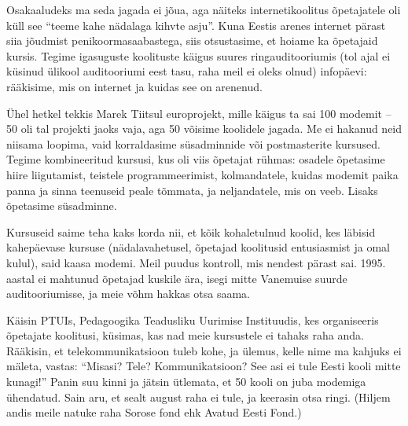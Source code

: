 
Osakaaludeks ma seda jagada ei jõua, aga näiteks internetikoolitus 
õpetajatele oli küll see \enquote{teeme kahe nädalaga kihvte asju}. Kuna Eestis 
arenes internet pärast siia jõudmist
penikoormasaabastega, siis otsustasime, et hoiame ka õpetajaid 
kursis. Tegime igasuguste koolituste käigus suures ringauditooriumis (tol 
ajal ei küsinud ülikool auditooriumi eest tasu, raha meil ei oleks 
olnud) infopäevi: rääkisime, mis on internet ja kuidas see on arenenud. 

Ühel hetkel tekkis Marek Tiitsul 
europrojekt, mille käigus ta sai 100 modemit -- 50 oli tal projekti jaoks vaja, 
aga 50 võisime koolidele jagada. Me ei hakanud neid niisama loopima, vaid 
korraldasime süsadminnide või postmasterite kursused. Tegime 
kombineeritud kursusi, kus oli viis õpetajat rühmas: osadele
õpetasime hiire liigutamist, teistele programmeerimist, 
kolmandatele, kuidas modemit paika panna ja sinna teenuseid peale 
tõmmata, ja neljandatele, mis on veeb. Lisaks õpetasime 
süsadminne. 

Kursuseid saime teha kaks korda nii, et kõik 
kohaletulnud koolid, kes läbisid kahepäevase kursuse (nädalavahetusel, õpetajad koolitusid entusiasmist ja omal kulul), 
said kaasa modemi. Meil puudus kontroll, mis nendest pärast sai. 1995. 
aastal ei mahtunud õpetajad kuskile ära, isegi mitte Vanemuise 
suurde auditooriumisse, ja meie võhm hakkas otsa 
saama. 

Käisin PTUIs, Pedagoogika Teadusliku Uurimise Instituudis, kes 
organiseeris õpetajate koolitusi, küsimas, kas nad meie kursustele ei tahaks 
raha anda. Rääkisin, et telekommunikatsioon tuleb kohe, ja 
ülemus, kelle nime ma kahjuks ei mäleta, vastas: \enquote{Misasi? Tele? 
Kommunikatsioon? See asi ei tule Eesti kooli mitte kunagi!} Panin suu kinni 
ja jätsin ütlemata, et 50 kooli on juba modemiga ühendatud. Sain aru, et sealt august raha ei tule, ja keerasin otsa 
ringi. (Hiljem andis meile natuke raha Sorose 
fond ehk Avatud Eesti Fond.)


